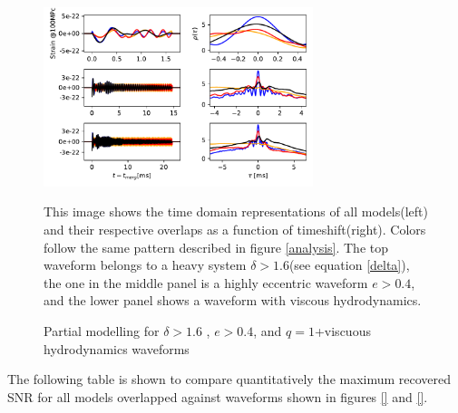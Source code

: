 \begin{figure}[hbt!]
\begin{center}
\includegraphics[width=0.7\textwidth, angle=0]{images/Data_analysis/results/phi-A2.pdf}
\caption{Partial modelling for $\delta>1.6$ , $e>0.4$, and $q=1$+viscuous hydrodynamics waveforms}
\end{center}
This image shows the time domain representations of all models(left) and their respective overlaps as a function of timeshift(right). Colors follow the same pattern described in figure \ref{analysis}. The top waveform belongs to a heavy system $\delta>1.6$(see equation \ref{delta}), the one in the middle panel is a highly eccentric waveform $e>0.4$, and the lower panel shows a waveform with viscous hydrodynamics.
\end{figure}
\FloatBarrier

The following table is shown to compare quantitatively the maximum recovered SNR for all models overlapped against waveforms shown in figures \ref{} and \ref{}.


